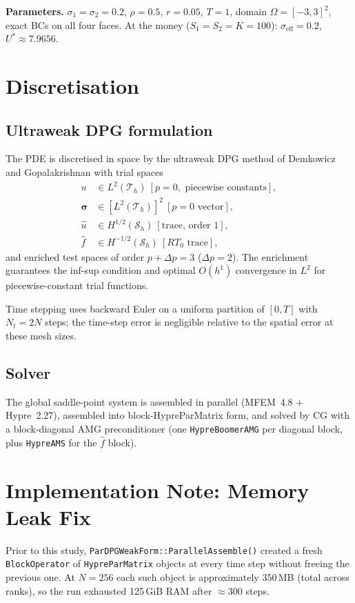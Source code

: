 \documentclass[11pt,a4paper]{article}
\begin{document}
\textbf{Parameters.}
$\sigma_1=\sigma_2=0.2$, $\rho=0.5$, $r=0.05$, $T=1$,
domain $\Omega=[-3,3]^2$, exact BCs on all four faces.
At the money ($S_1=S_2=K=100$): $\sigma_\mathrm{eff}=0.2$,
$U^*\approx 7.9656$.

\section{Discretisation}

\subsection{Ultraweak DPG formulation}

The PDE is discretised in space by the ultraweak DPG method of Demkowicz and
Gopalakrishnan with trial spaces
\begin{align*}
  u &\in L^2(\mathcal{T}_h)\ [p=0,\text{ piecewise constants}],\\
  \boldsymbol{\sigma} &\in [L^2(\mathcal{T}_h)]^2\ [p=0\text{ vector}],\\
  \hat u &\in H^{1/2}(\mathcal{S}_h)\ [\text{trace, order 1}],\\
  \hat f &\in H^{-1/2}(\mathcal{S}_h)\ [RT_0\text{ trace}],
\end{align*}
and enriched test spaces of order $p+\Delta p=3$ ($\Delta p=2$).
The enrichment guarantees the inf-sup condition and optimal $O(h^1)$ convergence
in $L^2$ for piecewise-constant trial functions.

Time stepping uses backward Euler on a uniform partition of $[0,T]$ with
$N_t = 2N$ steps; the time-step error is negligible relative to the spatial error
at these mesh sizes.

\subsection{Solver}

The global saddle-point system is assembled in parallel (MFEM~4.8 + Hypre~2.27),
assembled into block-HypreParMatrix form, and solved by CG with a
block-diagonal AMG preconditioner (one \texttt{HypreBoomerAMG} per diagonal block,
plus \texttt{HypreAMS} for the $\hat f$ block).

\section{Implementation Note: Memory Leak Fix}
\label{sec:impl}

Prior to this study, \texttt{ParDPGWeakForm::ParallelAssemble()} created a fresh
\texttt{BlockOperator} of \texttt{HypreParMatrix} objects at every time step without
freeing the previous one.  At $N=256$ each such object is approximately 350\,MB
(total across ranks), so the run exhausted 125\,GiB RAM after ${\approx}300$ steps.
\end{document}
